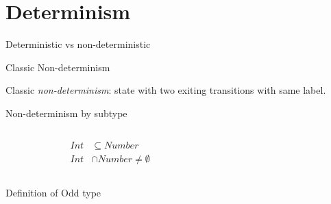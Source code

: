 \section{Determinism}

\begin{frame}{Deterministic vs non-deterministic }
  
\end{frame}

\begin{frame}{Classic Non-determinism}
  \scalebox{0.8}{}

  Classic \emph{non-determinism}: state with two exiting transitions with same label.

\end{frame}

\begin{frame}{Non-determinism by subtype}
  \begin{columns}
    \begin{column}{0.4\textwidth}
      \centering

    \begin{align*}
    Int&\subseteq Number\\
    Int &\cap Number \neq \emptyset
  \end{align*}
  \scalebox{0.8}{}
    \end{column}%
    \begin{column}{0.6\textwidth}
      \only<1>{\scalebox{0.65}{}}%
    \end{column}

  \end{columns}
\end{frame}



\newsavebox\oddbox
\begin{lrbox}{\oddbox}
  \begin{minipage}{11cm}
    
  \end{minipage}
\end{lrbox}

\begin{frame}{Definition of Odd type}
  \usebox\oddbox
\end{frame}


